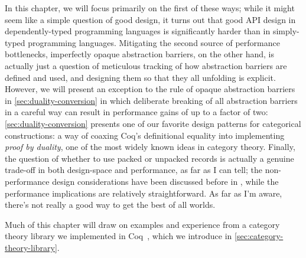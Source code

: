 In this chapter, we will focus primarily on the first of these ways; while it might seem like a simple question of good design, it turns out that good API design in dependently-typed programming languages is significantly harder than in simply-typed programming languages.
Mitigating the second source of performance bottlenecks, imperfectly opaque abstraction barriers, on the other hand, is actually just a question of meticulous tracking of how abstraction barriers are defined and used, and designing them so that they all unfolding is explicit.
However, we will present an exception to the rule of opaque abstraction barriers in \autoref{sec:duality-conversion} in which deliberate breaking of all abstraction barriers in a careful way can result in performance gains of up to a factor of two:
\autoref{sec:duality-conversion} presents one of our favorite design patterns for categorical constructions: a way of coaxing Coq's definitional equality into implementing \emph{proof by duality}, one of the most widely known ideas in category theory.
Finally, the question of whether to use packed or unpacked records is actually a genuine trade-off in both design-space and performance, as far as I can tell;
the non-performance design considerations have been discussed before in , while the performance implications are relatively straightforward.
As far as I'm aware, there's not really a good way to get the best of all worlds.

Much of this chapter will draw on examples and experience from a category theory library we implemented in Coq~\cite{category-coq-experience}, which we introduce in \autoref{sec:category-theory-library}.

